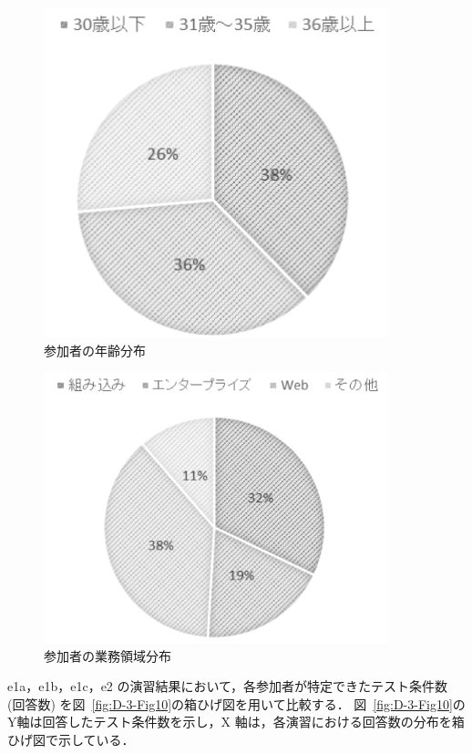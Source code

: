 \begin{figure}[h]
  \begin{center}
  \includegraphics[width=10cm]{./image/D-3-Fig6.png}
  \caption{参加者の年齢分布}
  \label{fig:D-3-Fig6}
  \end{center}
   \end{figure}

   \begin{figure}[h]
  \begin{center}
  \includegraphics[width=10cm]{./image/D-3-Fig7.png}
  \caption{参加者の業務領域分布}
  \label{fig:D-3-Fig7}
  \end{center}
   \end{figure}

e1a，e1b，e1c，e2 の演習結果において，各参加者が特定できたテスト条件数 (回答数) を図~\ref{fig:D-3-Fig10}の箱ひげ図を用いて比較する．
図~\ref{fig:D-3-Fig10}のY軸は回答したテスト条件数を示し，X 軸は，各演習における回答数の分布を箱ひげ図で示している．

